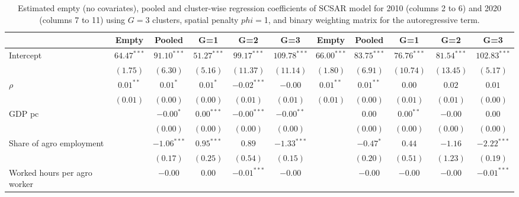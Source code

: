 
\begin{table}
\caption{Estimated empty (no covariates), pooled and cluster-wise regression coefficients of SCSAR model for 2010 (columns 2 to 6) and 2020 (columns 7 to 11) using $G=$3 clusters, spatial penalty $phi=$1, and binary weighting matrix for the autoregressive term.}
\begin{center}
\begin{tabular}{l c c c c c c c c c c}
\hline
 & Empty & Pooled & G=1 & G=2 & G=3 & Empty & Pooled & G=1 & G=2 & G=3 \\
\hline
Intercept                         & $64.47^{***}$ & $91.10^{***}$ & $51.27^{***}$ & $99.17^{***}$ & $109.78^{***}$ & $66.00^{***}$ & $83.75^{***}$ & $76.76^{***}$ & $81.54^{***}$ & $102.83^{***}$ \\
                                  & $(1.75)$      & $(6.30)$      & $(5.16)$      & $(11.37)$     & $(11.14)$      & $(1.80)$      & $(6.91)$      & $(10.74)$     & $(13.45)$     & $(5.17)$       \\
$\rho$                            & $0.01^{**}$   & $0.01^{*}$    & $0.01^{*}$    & $-0.02^{***}$ & $-0.00$        & $0.01^{**}$   & $0.01^{**}$   & $0.00$        & $0.02$        & $0.01$         \\
                                  & $(0.01)$      & $(0.00)$      & $(0.00)$      & $(0.01)$      & $(0.01)$       & $(0.01)$      & $(0.00)$      & $(0.01)$      & $(0.01)$      & $(0.00)$       \\
GDP pc                            &               & $-0.00^{*}$   & $0.00^{***}$  & $-0.00^{***}$ & $-0.00^{**}$   &               & $0.00$        & $0.00^{**}$   & $-0.00$       & $0.00$         \\
                                  &               & $(0.00)$      & $(0.00)$      & $(0.00)$      & $(0.00)$       &               & $(0.00)$      & $(0.00)$      & $(0.00)$      & $(0.00)$       \\
Share of agro employment          &               & $-1.06^{***}$ & $0.95^{***}$  & $0.89$        & $-1.33^{***}$  &               & $-0.47^{*}$   & $0.44$        & $-1.16$       & $-2.22^{***}$  \\
                                  &               & $(0.17)$      & $(0.25)$      & $(0.54)$      & $(0.15)$       &               & $(0.20)$      & $(0.51)$      & $(1.23)$      & $(0.19)$       \\
Worked hours per agro worker      &               & $-0.00$       & $0.00$        & $-0.01^{***}$ & $-0.00$        &               & $-0.00$       & $-0.00$       & $-0.00$       & $-0.01^{***}$  \\

\end{tabular}
\end{center}
\end{table}
